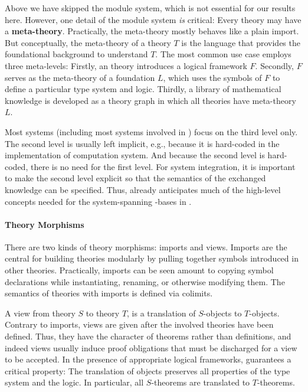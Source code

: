 


Above we have skipped the \MMT module system, which is not essential for our results here.
However, one detail of the \MMT module system \emph{is} critical: Every theory may have a \textbf{meta-theory}.
Practically, the meta-theory mostly behaves like a plain import.
But conceptually, the meta-theory of a theory $T$ is the language that provides the foundational background to understand $T$.
The most common use case employs three meta-levels: Firstly, an \MMT theory introduces a logical framework $F$.
Secondly, $F$ serves as the meta-theory of a foundation $L$, which uses the symbols of $F$ to define a particular type system and logic.
Thirdly, a library of mathematical knowledge is developed as a theory graph in which all theories have meta-theory $L$.

Most systems (including most systems involved in \pn) focus on the third level only.
The second level is usually left implicit, e.g., because it is hard-coded in the implementation of computation system.
And because the second level is hard-coded, there is no need for the first level.
For system integration, it is important to make the second level explicit so that the semantics of the exchanged knowledge can be specified.
Thus, \MMT already anticipates much of the high-level concepts needed for the system-spanning \DKS-bases in \pn.

\paragraph{Theory Morphisms}
There are two kinds of theory morphisms: imports and views.
Imports are the central for building theories modularly by pulling together symbols introduced in other theories.
Practically, imports can be seen amount to copying symbol declarations while instantiating, renaming, or otherwise modifying them.
The semantics of theories with imports is defined via colimits.

A view from theory $S$ to theory $T$, is a translation of $S$-objects to $T$-objects.
Contrary to imports, views are given after the involved theories have been defined.
Thus, they have the character of theorems rather than definitions, and indeed views usually induce proof obligations that must be discharged for a view to be accepted.
In the presence of appropriate logical frameworks, \MMT guarantees a critical property: The translation of objects preserves all properties of the type system and the logic.
In particular, all $S$-theorems are translated to $T$-theorems.

